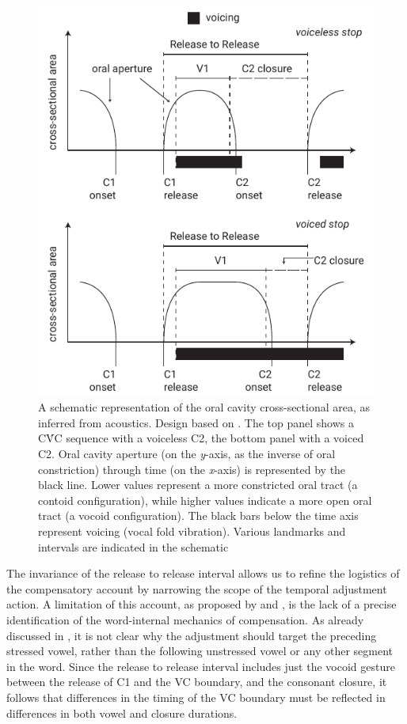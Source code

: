 \documentclass[charis]{glossa}
\begin{document}
\begin{figure}
  \centering
  \includegraphics{Figure7.pdf}
  \caption{A schematic representation of the oral cavity cross-sectional area, as inferred from acoustics. Design based on \citet{esposito2002}. The top panel shows a CV́C sequence with a voiceless C2, the bottom panel with a voiced C2. Oral cavity aperture (on the \textit{y}-axis, as the inverse of oral constriction) through time (on the \textit{x}-axis) is represented by the black line. Lower values represent a more constricted oral tract (a contoid configuration), while higher values indicate a more open oral tract (a vocoid configuration). The black bars below the time axis represent voicing (vocal fold vibration). Various landmarks and intervals are indicated in the schematic}
  \label{f:compensatory}
\end{figure}

The invariance of the release to release interval allows us to refine
the logistics of the compensatory account by narrowing the scope of the
temporal adjustment action. A limitation of this account, as proposed by
\citet{slis1969} and \citet{lehiste1970}, is the lack of a precise
identification of the word-internal mechanics of compensation. As
already discussed in , it is not clear why the adjustment
should target the preceding stressed vowel, rather than the following
unstressed vowel or any other segment in the word. Since the release to
release interval includes just the vocoid gesture between the release of
C1 and the VC boundary, and the consonant closure, it follows that
differences in the timing of the VC boundary must be reflected in
differences in both vowel and closure durations.
\end{document}

